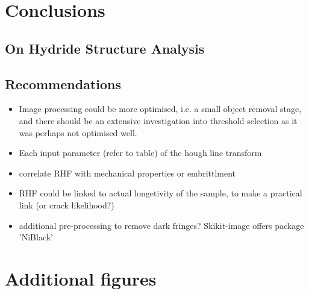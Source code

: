 \documentclass{article}
\begin{document}
\section{Conclusions}
\subsection{On Hydride Structure Analysis}

\subsection{Recommendations}
\begin{itemize}
    \item Image processing could be more optimised, i.e. a small object removal stage, and there should be an extensive investigation into threshold selection as it was perhaps not optimised well.
    \item Each input parameter (refer to table) of the hough line transform 
    
    \item correlate RHF with mechanical properties or embrittlment
    \item RHF could be linked to actual longetivity of the sample, to make a practical link (or crack likelihood?)
    \item additional pre-processing to remove dark fringes? Skikit-image offers package 'NiBlack'
\end{itemize}


\newpage



\newpage
\appendix
\section{Additional figures}
\end{document}
